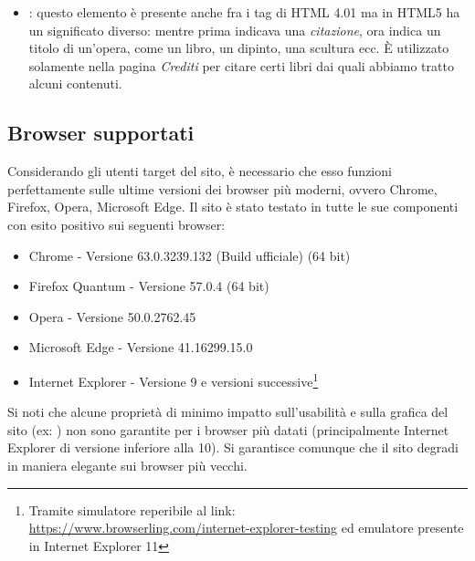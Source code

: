 \documentclass[12pt]{article}
\begin{document}
\begin{itemize}
		\item {}: questo elemento è presente anche fra i tag di HTML 4.01 ma in HTML5 ha un significato diverso: mentre prima indicava una \textit{citazione}, ora indica un titolo di un'opera, come un libro, un dipinto, una scultura ecc. È utilizzato solamente nella pagina \textit{Crediti} per citare certi libri dai quali abbiamo tratto alcuni contenuti.
	\end{itemize}
	
	\subsection{Browser supportati}
	
	Considerando gli utenti target del sito, è necessario che esso funzioni perfettamente sulle ultime versioni dei browser più moderni, ovvero Chrome, Firefox, Opera, Microsoft Edge. Il sito è stato testato in tutte le sue componenti con esito positivo sui seguenti browser:
	
	\begin{itemize}
		\item Chrome - Versione 63.0.3239.132 (Build ufficiale) (64 bit)
		\item Firefox Quantum - Versione 57.0.4 (64 bit)
		\item Opera - Versione 50.0.2762.45 
		\item Microsoft Edge - Versione 41.16299.15.0
		\item Internet Explorer - Versione 9 e versioni successive\footnote{Tramite simulatore reperibile al link:\\ \url{https://www.browserling.com/internet-explorer-testing} ed emulatore presente in Internet Explorer 11}
	\end{itemize} 

	\noindent Si noti che alcune proprietà di minimo impatto sull'usabilità e sulla grafica del sito (ex: ) non sono garantite per i browser più datati (principalmente Internet Explorer di versione inferiore alla 10). Si garantisce comunque che il sito degradi in maniera elegante sui browser più vecchi.
\end{document}
